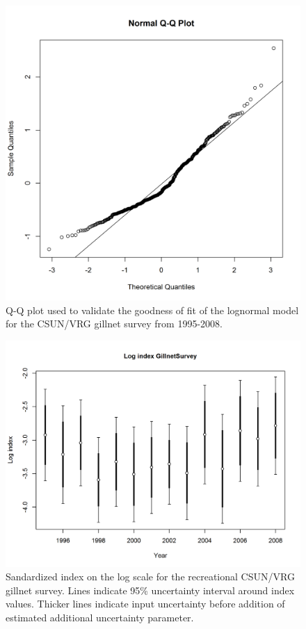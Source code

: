 \documentclass[12pt,]{article}
\begin{document}
\FloatBarrier

\begin{figure}[htbp]
\centering
\includegraphics{Figures/Fleet9_GillnetSurvey_QQ.png}
\caption{Q-Q plot used to validate the goodness of fit of the lognormal
model for the CSUN/VRG gillnet survey from 1995-2008.
\label{fig:Fleet9_GillnetSurvey_QQ}}
\end{figure}

\begin{figure}[htbp]
\centering
\includegraphics{r4ss/plots_mod1/index4_logcpuedata_GillnetSurvey.png}
\caption{Sandardized index on the log scale for the recreational
CSUN/VRG gillnet survey. Lines indicate 95\% uncertainty interval around
index values. Thicker lines indicate input uncertainty before addition
of estimated additional uncertainty parameter.
\label{fig:index4_logcpuedata_GillnetSurvey}}
\end{figure}
\end{document}
